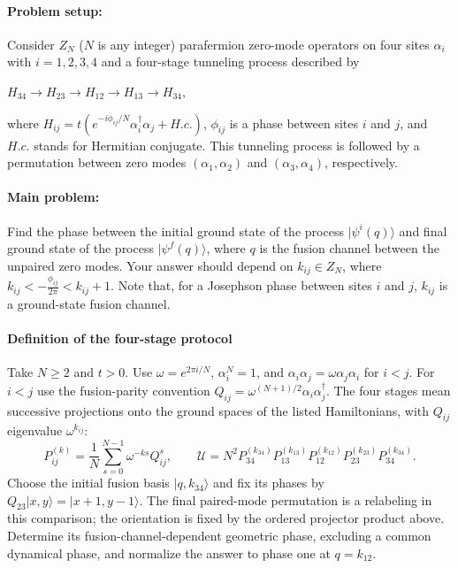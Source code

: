 \documentclass[11pt]{article}
\begin{document}
\paragraph*{Problem setup:}
Consider $Z_N$ ($N$ is any integer) parafermion zero-mode operators on four sites $\alpha_i$ with $i=1,2,3,4$ and a four-stage tunneling process described by

$
H_{34}\rightarrow H_{23} \rightarrow H_{12}\rightarrow H_{13}\rightarrow H_{34},
$

where
$
H_{ij}=t\left(e^{-i\phi_{ij}/N}\alpha_i^\dagger\alpha_j+H.c.\right)
$, $\phi_{ij}$ is a phase between sites $i$ and $j$, and $H.c.$ stands for Hermitian conjugate. This tunneling process is followed by a permutation between zero modes $(\alpha_1,\alpha_2)$ and $(\alpha_3,\alpha_4)$, respectively.

\paragraph*{Main problem:}
Find the phase between the initial ground state of the process $|\psi^i(q)\rangle$ and final ground state of the process $|\psi^f(q)\rangle$, where $q$ is the fusion channel between the unpaired zero modes. Your answer should depend on $k_{ij}\in Z_N$, where $k_{ij}<-\frac{\phi_{ij}}{2\pi}<k_{ij}+1$. Note that, for a Josephson phase between sites $i$ and $j$, $k_{ij}$ is a ground-state fusion channel.

\paragraph*{Definition of the four-stage protocol}
Take $N\geq2$ and $t>0$. Use $\omega=e^{2\pi i/N}$,
$\alpha_i^N=1$, and $\alpha_i\alpha_j=\omega\alpha_j\alpha_i$ for $i<j$.
For $i<j$ use the fusion-parity convention
$Q_{ij}=\omega^{(N+1)/2}\alpha_i\alpha_j^\dagger$.
The four stages mean successive projections onto the ground spaces of the
listed Hamiltonians, with $Q_{ij}$ eigenvalue $\omega^{k_{ij}}$:
\[
P_{ij}^{(k)}=\frac1N\sum_{s=0}^{N-1}\omega^{-ks}Q_{ij}^{s},\qquad
\mathcal U=N^2P_{34}^{(k_{34})}P_{13}^{(k_{13})}
P_{12}^{(k_{12})}P_{23}^{(k_{23})}P_{34}^{(k_{34})}.
\]
Choose the initial fusion basis $|q,k_{34}\rangle$ and fix its phases by
$Q_{23}|x,y\rangle=|x+1,y-1\rangle$.
The final paired-mode permutation is a relabeling in this comparison; the
orientation is fixed by the ordered projector product above. Determine its
fusion-channel-dependent geometric phase, excluding a common dynamical phase,
and normalize the answer to phase one at $q=k_{12}$.
\end{document}
